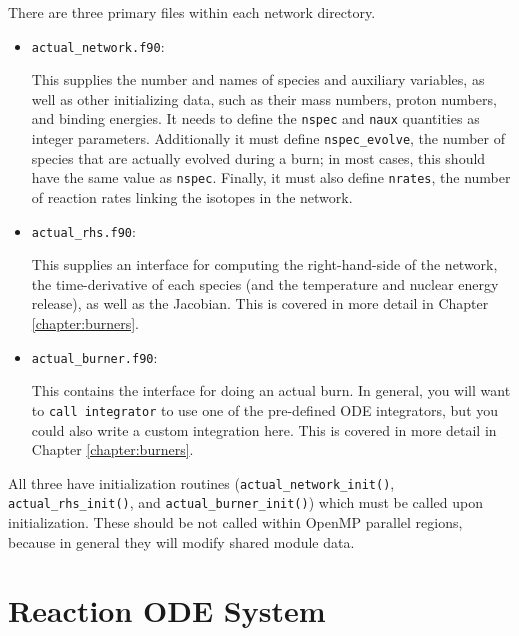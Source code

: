 There are three primary files within each network directory.

\begin{itemize}

\item {\tt actual\_network.f90}:

 This supplies the number and names of species and
auxiliary variables, as well as other initializing data, such as their
mass numbers, proton numbers, and binding energies. It needs to define
the {\tt nspec} and {\tt naux} quantities as integer parameters. Additionally
it must define {\tt nspec\_evolve}, the number of species that are actually evolved
during a burn; in most cases, this should have the same value as {\tt nspec}.
Finally, it must also define {\tt nrates}, the number of reaction rates
linking the isotopes in the network.

\item {\tt actual\_rhs.f90}:

This supplies an interface for computing the right-hand-side
of the network, the time-derivative of each species (and the temperature and
nuclear energy release), as well as the Jacobian. This is covered in more detail
in Chapter \ref{chapter:burners}.

\item {\tt actual\_burner.f90}: 

This contains the interface for doing an actual burn.
In general, you will want to {\tt call integrator} to use one of the pre-defined
ODE integrators, but you could also write a custom integration here. This is
covered in more detail in Chapter \ref{chapter:burners}.

\end{itemize}

All three have initialization routines ({\tt actual\_network\_init()},
{\tt actual\_rhs\_init()}, and {\tt actual\_burner\_init()}) which must
be called upon initialization. These should be not called within
OpenMP parallel regions, because in general they will modify shared module data.


\section{Reaction ODE System}

